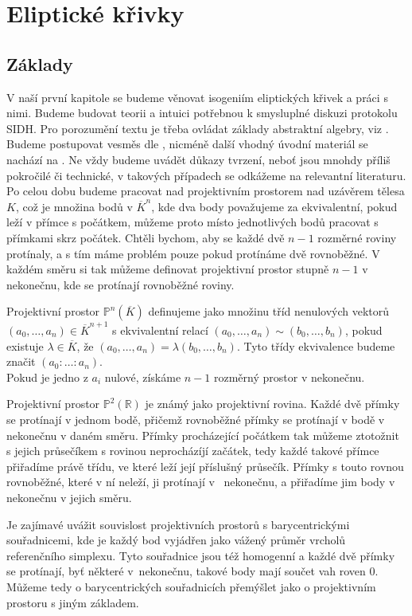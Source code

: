 \documentclass [12pt]{report}
\begin{document}
\chapter{Eliptické křivky}

\section{Základy}

V naší první kapitole se budeme věnovat isogeniím eliptických křivek a práci s nimi. Budeme budovat teorii a intuici potřebnou k smysluplné diskuzi protokolu SIDH. Pro porozumění textu je třeba ovládat základy abstraktní algebry, viz \cite{Rosicky}. Budeme postupovat vesměs dle \cite{DeFeo2}, nicméně další vhodný úvodní materiál se nachází na \cite{Sutherland}. Ne vždy budeme uvádět důkazy tvrzení, neboť jsou mnohdy příliš pokročilé či technické, v takových případech se odkážeme na relevantní literaturu. \\

Po celou dobu budeme pracovat nad projektivním prostorem nad uzávěrem tělesa $K$, což je množina bodů v $\overline{K}^n$, kde dva body považujeme za ekvivalentní, pokud leží v přímce s počátkem, můžeme proto místo jednotlivých bodů pracovat s přímkami skrz počátek. Chtěli bychom, aby se každé dvě $n-1$ rozměrné roviny protínaly, a s tím máme problém pouze pokud protínáme dvě rovnoběžné. V každém směru si tak můžeme definovat projektivní prostor stupně $n-1$ v nekonečnu, kde se protínají rovnoběžné roviny.

\begin{definice}
Projektivní prostor $\mathbb{P}^n (\overline{K})$ definujeme jako množinu tříd nenulových vektorů $(a_0, \dots, a_n) \in \overline{K}^{n+1}$ s ekvivalentní relací $(a_0, \dots, a_n) \sim (b_0, \dots, b_n)$, pokud existuje $\lambda \in \overline{K}$, že $(a_0, \dots, a_n) = \lambda (b_0, \dots, b_n)$. Tyto třídy ekvivalence budeme značit $(a_0 : \dots : a_n)$.\\

Pokud je jedno z $a_i$ nulové, získáme $n-1$ rozměrný prostor v nekonečnu.
\end{definice}

Projektivní prostor $\mathbb{P}^2 (\mathbb{R})$ je známý jako projektivní rovina. Každé dvě přímky se protínají v jednom bodě, přičemž rovnoběžné přímky se protínají v bodě v nekonečnu v daném směru. Přímky procházející počátkem tak můžeme ztotožnit s jejich průsečíkem s rovinou neprocházíjí začátek, tedy každé takové přímce přiřadíme právě třídu, ve které leží její příslušný průsečík. Přímky s touto rovnou rovnoběžné, které v ní neleží, ji protínají v~ nekonečnu, a přiřadíme jim body v nekonečnu v jejich směru.
\begin{poznamka}
Je zajímavé uvážit souvislost projektivních prostorů s barycentrickými souřadnicemi, kde je každý bod vyjádřen jako vážený průměr vrcholů referenčního simplexu. Tyto souřadnice jsou též homogenní a každé dvě přímky se protínají, byť některé v~nekonečnu, takové body mají součet vah roven $0$. Můžeme tedy o barycentrických souřadnicích přemýšlet jako o projektivním prostoru s jiným základem.
\end{poznamka}
\end{document}
